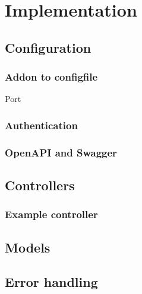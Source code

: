\chapter{Implementation}

\section{Configuration}
\subsection{Addon to configfile}
Port
\subsection{Authentication}
\subsection{OpenAPI and Swagger}

\section{Controllers}
\subsection{Example controller}

\section{Models}

\section{Error handling}

